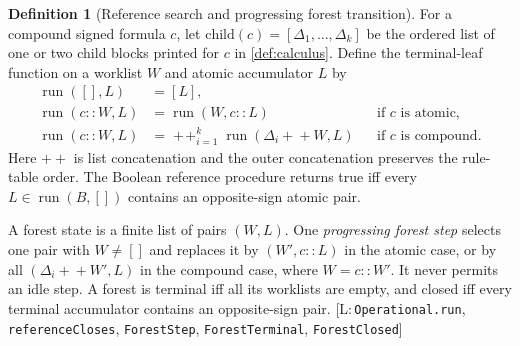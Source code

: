 \documentclass[11pt,a4paper]{article}
\theoremstyle{definition}
\newtheorem{definition}[theorem]{Definition}
\newcommand{\lean}[1]{\texttt{#1}}
\begin{document}
\begin{definition}[Reference search and progressing forest transition]
\label{def:reference-search}
For a compound signed formula $c$, let
$\mathrm{child}(c)=[\Delta_1,\ldots,\Delta_k]$ be the ordered list of
one or two child blocks printed for $c$ in \cref{def:calculus}. Define the
terminal-leaf function on a worklist $W$ and atomic accumulator $L$ by
\[
\begin{aligned}
\operatorname{run}([],L)&=[L],\\
\operatorname{run}(c::W,L)&=\operatorname{run}(W,c::L)
 &&\text{if $c$ is atomic},\\
\operatorname{run}(c::W,L)&=
 \mathop{+\!+}_{i=1}^{k}\operatorname{run}(\Delta_i+\!+W,L)
 &&\text{if $c$ is compound}.
\end{aligned}
\]
Here $+\!+$ is list concatenation and the outer concatenation preserves the
rule-table order. The Boolean reference procedure returns true iff every
$L\in\operatorname{run}(B,[])$ contains an opposite-sign atomic pair.

A forest state is a finite list of pairs $(W,L)$. One \emph{progressing
forest step} selects one pair with $W\ne[]$ and replaces it by $(W',c::L)$
in the atomic case, or by all $(\Delta_i+\!+W',L)$ in the compound case,
where $W=c::W'$. It never permits an idle step. A forest is terminal iff
all its worklists are empty, and closed iff every terminal accumulator
contains an opposite-sign pair.
[L:\,\lean{Operational.run}, \lean{referenceCloses},
\lean{ForestStep}, \lean{ForestTerminal}, \lean{ForestClosed}]
\end{definition}
\end{document}
